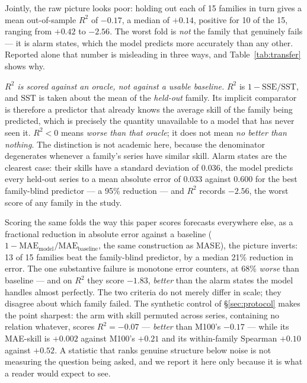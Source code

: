 \documentclass[11pt,a4paper]{article}
\newcommand{\num}[1]{#1}
\begin{document}
Jointly, the raw picture looks poor: holding out each of \num{15} families in
turn gives a mean out-of-sample \(R^2\) of \(-0.17\), a median of \(+0.14\),
positive for \num{10} of the \num{15}, ranging from \(+0.42\) to \(-2.56\).
The worst fold is \emph{not} the family that genuinely fails --- it is alarm
states, which the model predicts more accurately than any other. Reported alone
that number is misleading in three ways, and Table~\ref{tab:transfer} shows
why.

\emph{\(R^2\) is scored against an oracle, not against a usable baseline.}
\(R^2\) is \(1-\mathrm{SSE}/\mathrm{SST}\), and \(\mathrm{SST}\) is taken about
the mean of the \emph{held-out} family. Its implicit comparator is therefore a
predictor that already knows the average skill of the family being predicted,
which is precisely the quantity unavailable to a model that has never seen it.
\(R^2<0\) means \emph{worse than that oracle}; it does not mean \emph{no better
than nothing}. The distinction is not academic here, because the denominator
degenerates whenever a family's series have similar skill. Alarm states are the
clearest case: their skills have a standard deviation of \num{0.036}, the model
predicts every held-out series to a mean absolute error of \num{0.033} against
\num{0.600} for the best family-blind predictor --- a \num{95}\% reduction ---
and \(R^2\) records \(-2.56\), the worst score of any family in the study.

Scoring the same folds the way this paper scores forecasts everywhere else, as
a fractional reduction in absolute error against a baseline
(\(1-\mathrm{MAE}_{\text{model}}/\mathrm{MAE}_{\text{baseline}}\), the same
construction as MASE), the picture inverts: \num{13} of \num{15} families beat
the family-blind predictor, by a median \num{21}\% reduction in error. The one substantive failure is monotone
error counters, at \num{68}\% \emph{worse} than baseline --- and on \(R^2\)
they score \(-1.83\), \emph{better} than the alarm states the model handles
almost perfectly. The two criteria do not merely differ in scale; they disagree
about which family failed. The synthetic control of \S\ref{sec:protocol} makes the point sharpest:
the arm with skill permuted across series, containing no relation whatever,
scores \(R^2=-0.07\) --- \emph{better} than M100's \(-0.17\) --- while its
MAE-skill is \(+0.002\) against M100's \(+0.21\) and its within-family Spearman
\(+0.10\) against \(+0.52\). A statistic that ranks genuine structure below
noise is not measuring the question being asked, and we report it here only
because it is what a reader would expect to see.
\end{document}
